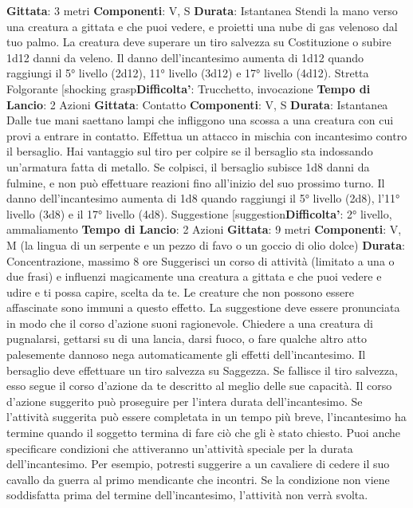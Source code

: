 \begin{multicols}{2}
\textbf{Gittata}: 3 metri
\textbf{Componenti}: V, S
\textbf{Durata}: Istantanea
Stendi la mano verso una creatura a gittata e che puoi
vedere, e proietti una nube di gas velenoso dal tuo
palmo. La creatura deve superare un tiro salvezza su
Costituzione o subire 1d12 danni da veleno.
Il danno dell’incantesimo aumenta di 1d12 quando
raggiungi il 5° livello (2d12), 11° livello (3d12) e 17°
livello (4d12).
Stretta Folgorante
[shocking grasp\textbf{Difficolta'}:
Trucchetto, invocazione
\textbf{Tempo di Lancio}: 2 Azioni
\textbf{Gittata}: Contatto
\textbf{Componenti}: V, S
\textbf{Durata}: Istantanea
Dalle tue mani saettano lampi che infliggono una
scossa a una creatura con cui provi a entrare in
contatto. Effettua un attacco in mischia con incantesimo
contro il bersaglio. Hai vantaggio sul tiro per colpire se il
bersaglio sta indossando un’armatura fatta di metallo.
Se colpisci, il bersaglio subisce 1d8 danni da fulmine, e
non può effettuare reazioni fino all’inizio del suo
prossimo turno.
Il danno dell’incantesimo aumenta di 1d8 quando
raggiungi il 5° livello (2d8), l’11° livello (3d8) e il 17°
livello (4d8).
Suggestione
[suggestion\textbf{Difficolta'}:
2° livello, ammaliamento
\textbf{Tempo di Lancio}: 2 Azioni
\textbf{Gittata}: 9 metri
\textbf{Componenti}: V, M (la lingua di un serpente e un pezzo
di favo o un goccio di olio dolce)
\textbf{Durata}: Concentrazione, massimo 8 ore
Suggerisci un corso di attività (limitato a una o due
frasi) e influenzi magicamente una creatura a gittata e
che puoi vedere e udire e ti possa capire, scelta da te.
Le creature che non possono essere affascinate sono
immuni a questo effetto. La suggestione deve essere
pronunciata in modo che il corso d’azione suoni
ragionevole. Chiedere a una creatura di pugnalarsi,
gettarsi su di una lancia, darsi fuoco, o fare qualche
altro atto palesemente dannoso nega automaticamente
gli effetti dell’incantesimo.
Il bersaglio deve effettuare un tiro salvezza su
Saggezza. Se fallisce il tiro salvezza, esso segue il
corso d’azione da te descritto al meglio delle sue
capacità. Il corso d’azione suggerito può proseguire per
l’intera durata dell’incantesimo. Se l’attività suggerita
può essere completata in un tempo più breve,
l’incantesimo ha termine quando il soggetto termina di
fare ciò che gli è stato chiesto.
Puoi anche specificare condizioni che attiveranno
un’attività speciale per la durata dell’incantesimo. Per
esempio, potresti suggerire a un cavaliere di cedere il
suo cavallo da guerra al primo mendicante che incontri.
Se la condizione non viene soddisfatta prima del
termine dell’incantesimo, l’attività non verrà svolta.

\end{multicols}
